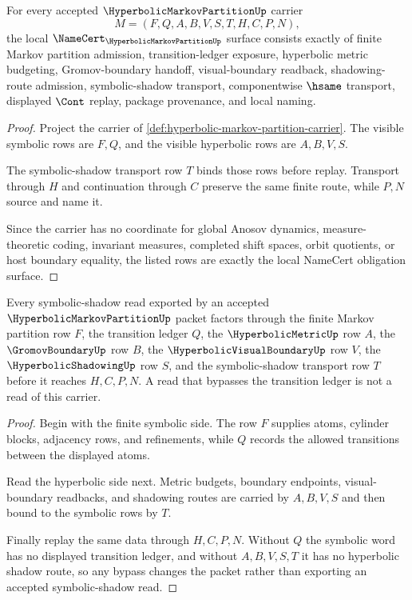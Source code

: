 \begin{theorem}
\label{thm:hyperbolic-markov-partition-namecert-obligations}
For every accepted $\HyperbolicMarkovPartitionUp$ carrier
$$
M=(F,Q,A,B,V,S,T,H,C,P,N),
$$
the local $\NameCert_{\HyperbolicMarkovPartitionUp}$ surface consists exactly of finite Markov partition admission, transition-ledger exposure, hyperbolic metric budgeting, Gromov-boundary handoff, visual-boundary readback, shadowing-route admission, symbolic-shadow transport, componentwise $\hsame$ transport, displayed $\Cont$ replay, package provenance, and local naming.
\end{theorem}
\begin{proof}
Project the carrier of \autoref{def:hyperbolic-markov-partition-carrier}. The visible symbolic rows are $F,Q$, and the visible hyperbolic rows are $A,B,V,S$.

The symbolic-shadow transport row $T$ binds those rows before replay. Transport through $H$ and continuation through $C$ preserve the same finite route, while $P,N$ source and name it.

Since the carrier has no coordinate for global Anosov dynamics, measure-theoretic coding, invariant measures, completed shift spaces, orbit quotients, or host boundary equality, the listed rows are exactly the local NameCert obligation surface.
\end{proof}

\begin{theorem}
\label{thm:hyperbolic-markov-partition-symbolic-shadow-route}
Every symbolic-shadow read exported by an accepted $\HyperbolicMarkovPartitionUp$ packet factors through the finite Markov partition row $F$, the transition ledger $Q$, the $\HyperbolicMetricUp$ row $A$, the $\GromovBoundaryUp$ row $B$, the $\HyperbolicVisualBoundaryUp$ row $V$, the $\HyperbolicShadowingUp$ row $S$, and the symbolic-shadow transport row $T$ before it reaches $H,C,P,N$. A read that bypasses the transition ledger is not a read of this carrier.
\end{theorem}
\begin{proof}
Begin with the finite symbolic side. The row $F$ supplies atoms, cylinder blocks, adjacency rows, and refinements, while $Q$ records the allowed transitions between the displayed atoms.

Read the hyperbolic side next. Metric budgets, boundary endpoints, visual-boundary readbacks, and shadowing routes are carried by $A,B,V,S$ and then bound to the symbolic rows by $T$.

Finally replay the same data through $H,C,P,N$. Without $Q$ the symbolic word has no displayed transition ledger, and without $A,B,V,S,T$ it has no hyperbolic shadow route, so any bypass changes the packet rather than exporting an accepted symbolic-shadow read.
\end{proof}

